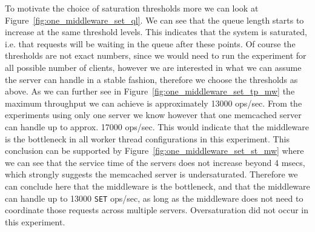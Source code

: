 \documentclass[11pt,a4paper]{article}
\begin{document}
%
To motivate the choice of saturation thresholds more we can look at Figure~\ref{fig:one_middleware_set_ql}.
%
We can see that the queue length starts to increase at the same threshold levels.
%
This indicates that the system is saturated, i.e. that requests will be waiting in the queue after these points.
%
Of course the thresholds are not exact numbers, since we would need to run the experiment for all possible number of clients, however we are interested in what we can assume the server can handle in a stable fashion, therefore we choose the thresholds as above.
%
As we can further see in Figure~\ref{fig:one_middleware_set_tp_mw} the maximum throughput we can achieve is approximately 13000 ops/sec.
%
From the experiments using only one server we know however that one memcached server can handle up to approx. 17000 ops/sec.
%
This would indicate that the middleware is the bottleneck in all worker thread configurations in this experiment.
%
This conclusion can be supported by Figure~\ref{fig:one_middleware_set_st_mw} where we can see that the service time of the servers does not increase beyond 4 msecs, which strongly suggests the memcached server is undersaturated.
%
Therefore we can conclude here that the middleware is the bottleneck, and that the middleware can handle up to 13000 \texttt{SET} ops/sec, as long as the middleware does not need to coordinate those requests across multiple servers.
%
Oversaturation did not occur in this experiment.
%
\end{document}
